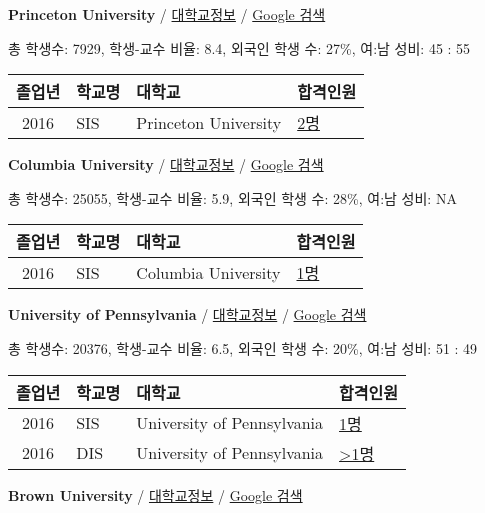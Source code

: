 \documentclass[13pt,]{article}
\begin{document}
\textbf{Princeton University} /
\href{https://www.timeshighereducation.com/world-university-rankings/princeton-university?ranking-dataset=589595}{대학교정보}
/ \href{http://www.google.com/search?q=Princeton+University}{Google
검색}

총 학생수: 7929, 학생-교수 비율: 8.4, 외국인 학생 수: 27\%, 여:남 성비:
45 : 55

\begin{longtable}[]{@{}clll@{}}
\toprule
졸업년 & 학교명 & 대학교 & 합격인원\tabularnewline
\midrule
\endhead
2016 & SIS & Princeton University &
\href{http://cafe.naver.com/assarabia/11589}{2명}\tabularnewline
\bottomrule
\end{longtable}

\textbf{Columbia University} /
\href{https://www.timeshighereducation.com/world-university-rankings/columbia-university?ranking-dataset=589595}{대학교정보}
/ \href{http://www.google.com/search?q=Columbia+University}{Google 검색}

총 학생수: 25055, 학생-교수 비율: 5.9, 외국인 학생 수: 28\%, 여:남 성비:
NA

\begin{longtable}[]{@{}clll@{}}
\toprule
졸업년 & 학교명 & 대학교 & 합격인원\tabularnewline
\midrule
\endhead
2016 & SIS & Columbia University &
\href{http://cafe.naver.com/assarabia/11589}{1명}\tabularnewline
\bottomrule
\end{longtable}

\textbf{University of Pennsylvania} /
\href{https://www.timeshighereducation.com/world-university-rankings/university-of-pennsylvania?ranking-dataset=589595}{대학교정보}
/
\href{http://www.google.com/search?q=University+of+Pennsylvania}{Google
검색}

총 학생수: 20376, 학생-교수 비율: 6.5, 외국인 학생 수: 20\%, 여:남 성비:
51 : 49

\begin{longtable}[]{@{}clll@{}}
\toprule
졸업년 & 학교명 & 대학교 & 합격인원\tabularnewline
\midrule
\endhead
2016 & SIS & University of Pennsylvania &
\href{http://cafe.naver.com/assarabia/11589}{1명}\tabularnewline
2016 & DIS & University of Pennsylvania &
\href{http://cafe.naver.com/assarabia/11591}{\textgreater{}1명}\tabularnewline
\bottomrule
\end{longtable}

\textbf{Brown University} /
\href{https://www.timeshighereducation.com/world-university-rankings/brown-university?ranking-dataset=589595}{대학교정보}
/ \href{http://www.google.com/search?q=Brown+University}{Google 검색}
\end{document}
